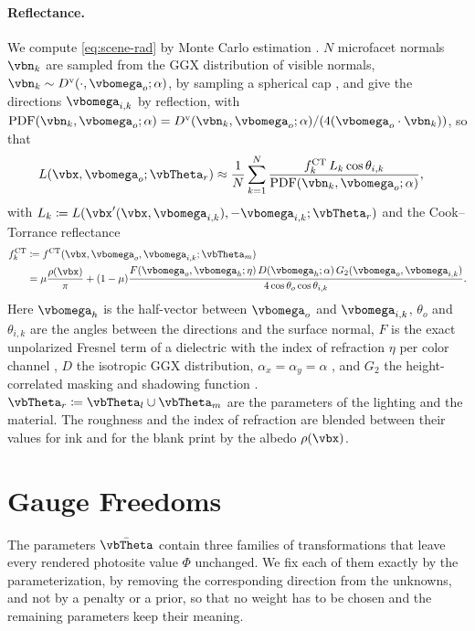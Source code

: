 \paragraph{Reflectance.}
We compute \cref{eq:scene-rad} by Monte Carlo estimation
\cite{pharr2023physically}. $N$ microfacet normals \cite{microfacet}
$\vbn_k$ are sampled from the GGX distribution of visible normals,
$\vbn_k \sim D^{\text{v}}(\cdot, \vbomega_o; \alpha)$, by sampling a
spherical cap \cite{sphericalCaps}, and give the directions
$\vbomega_{i,k}$ by reflection, with
$\text{PDF}(\vbn_k, \vbomega_o; \alpha)= D^{\text{v}}(\vbn_k, \vbomega_o;\alpha)/(4 (\vbomega_o \cdot \vbn_k))$,
so that
\begin{align*}
    &L(\vbx,\vbomega_o;\vbTheta_r)
    \approx \frac{1}{N} \sum_{k=1}^N \frac{f^{\text{CT}}_k\,L_k\cos\theta_{i,k}}{\text{PDF}(\vbn_k, \vbomega_o; \alpha)},
\end{align*}
with $L_k\coloneqq L(\vbx'(\vbx,\vbomega_{i,k}),-\vbomega_{i,k};\vbTheta_r)$
and the Cook--Torrance reflectance \cite{cookTorrance, sphericalCaps}
\begin{align*}
    f^{\text{CT}}_k
    &\coloneqq f^{\text{CT}}(\vbx,\vbomega_o,\vbomega_{i,k}; \vbTheta_m)\\
    &= \mu\frac{\rho(\vbx)}{\pi}
    + (1-\mu)\frac{F(\vbomega_o, \vbomega_h; \eta)\, D(\vbomega_h; \alpha)\, G_2(\vbomega_o, \vbomega_{i,k})}{4\cos\theta_o\cos\theta_{i,k}}.
\end{align*}
Here $\vbomega_h$ is the half-vector between $\vbomega_o$ and
$\vbomega_{i,k}$, $\theta_o$ and $\theta_{i,k}$ are the angles
between the directions and the surface normal, $F$ is the exact
unpolarized Fresnel term of a dielectric with the index of
refraction $\eta$ per color channel \cite{pharr2023physically}, $D$
the isotropic GGX distribution, $\alpha_x=\alpha_y=\alpha$
\cite{Heitz2014Microfacet}, and $G_2$ the height-correlated masking
and shadowing function \cite{sphericalCaps, Heitz2014Microfacet}.
$\vbTheta_r\coloneqq\vbTheta_l\cup\vbTheta_m$ are the parameters of
the lighting and the material. The roughness and the index of
refraction are blended between their values for ink and for the
blank print by the albedo $\rho(\vbx)$.


\section{Gauge Freedoms}
\label{sec:supp-gauge-freedoms}
The parameters $\bar{\vbTheta}$ contain three families of
transformations that leave every rendered photosite value $\Phi$
unchanged. We fix each of them exactly by the parameterization, \ie by
removing the corresponding direction from the unknowns, and not by a
penalty or a prior, so that no weight has to be chosen and the
remaining parameters keep their meaning.

